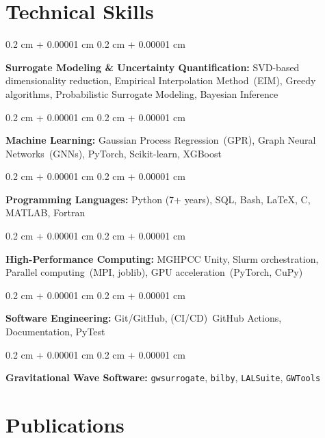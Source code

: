 \documentclass[10pt, letterpaper]{article}
\newenvironment{onecolentry}{
    \begin{adjustwidth}{
        0.2 cm + 0.00001 cm
    }{
        0.2 cm + 0.00001 cm
    }
}{
    \end{adjustwidth}
}
\begin{document}
\section{Technical Skills}

\begin{onecolentry}
  \textbf{Surrogate Modeling \& Uncertainty Quantification:} SVD-based dimensionality reduction, 
  Empirical Interpolation Method~(EIM), Greedy algorithms, Probabilistic Surrogate Modeling, Bayesian Inference
\end{onecolentry}

\vspace{0.2 cm}

\begin{onecolentry}
  \textbf{Machine Learning:} Gaussian Process Regression~(GPR), Graph Neural Networks~(GNNs), PyTorch, Scikit-learn, 
  XGBoost
\end{onecolentry}

\vspace{0.2 cm}

\begin{onecolentry}
  \textbf{Programming Languages:} Python (7+ years), SQL, Bash, LaTeX, C, MATLAB, Fortran
\end{onecolentry}

\vspace{0.2 cm}

\begin{onecolentry}
  \textbf{High-Performance Computing:} MGHPCC Unity, Slurm orchestration, Parallel computing~(MPI, joblib), 
  GPU acceleration~(PyTorch, CuPy)
\end{onecolentry}

\vspace{0.2 cm}

\begin{onecolentry}
  \textbf{Software Engineering:} Git/GitHub, (CI/CD)~GitHub Actions,  
  Documentation, PyTest
\end{onecolentry}

\vspace{0.2 cm}

\begin{onecolentry}
  \textbf{Gravitational Wave Software:} \texttt{gwsurrogate}, \texttt{bilby}, \texttt{LALSuite}, 
  \texttt{GWTools}
\end{onecolentry}


\section{Publications}
\end{document}
